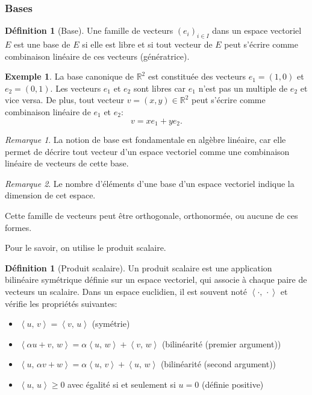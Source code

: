 \documentclass[11pt,a4paper]{article}
\numberwithin{equation}{section}
\theoremstyle{plain}
\theoremstyle{definition}
\newtheorem{definition}[theorem]{Définition}
\newtheorem{example}[theorem]{Exemple}
\theoremstyle{remark}
\newtheorem*{remark}{Remarque}
\newcommand{\R}{\mathbb{R}}
\newcommand{\ip}[2]{\left\langle #1,\, #2\right\rangle}
\begin{document}
\subsubsection{Bases}

\begin{definition}[Base]
Une famille de vecteurs \((e_i)_{i \in I}\) dans un espace vectoriel \(E\) est une base de \(E\) si elle est libre et si tout vecteur de \(E\) peut s'écrire  comme combinaison linéaire de ces vecteurs (génératrice).
\end{definition}

\begin{example}
    La base canonique de \(\R^2\) est constituée des vecteurs \(e_1 = (1, 0)\) et \(e_2 = (0, 1)\).
    Les vecteurs \(e_1\) et \(e_2\) sont libres car $e_1$ n'est pas un multiple de $e_2$ et vice versa.
    De plus, tout vecteur \(v = (x, y) \in \R^2\) peut s'écrire comme combinaison linéaire de \(e_1\) et \(e_2\):
    \[
        v = x e_1 + y e_2.
    \]
\end{example}

\begin{remark}
    La notion de base est fondamentale en algèbre linéaire, car elle permet de décrire tout vecteur d'un espace vectoriel comme une combinaison linéaire de vecteurs de cette base.
\end{remark}

\begin{remark}
    Le nombre d'éléments d'une base d'un espace vectoriel indique la dimension de cet espace.
\end{remark}

Cette famille de vecteurs peut être orthogonale, orthonormée, ou aucune de ces formes.

Pour le savoir, on utilise le produit scalaire.


\begin{definition}[Produit scalaire] \label{def:ip}
    Un produit scalaire est une application bilinéaire symétrique définie sur un espace vectoriel, qui associe à chaque paire de vecteurs un scalaire. Dans un espace euclidien, il est souvent noté \(\ip{\cdot}{\cdot}\) et vérifie les propriétés suivantes:
    \begin{itemize}
        \item \(\ip{u}{v} = \ip{v}{u}\) (symétrie)
        \item \(\ip{\alpha u + v}{w} = \alpha \ip{u}{w} + \ip{v}{w}\) (bilinéarité (premier argument))
        \item \(\ip{u}{\alpha v + w} = \alpha \ip{u}{v} + \ip{u}{w}\) (bilinéarité (second argument))
        \item \(\ip{u}{u} \geq 0\) avec égalité si et seulement si \(u = 0\) (définie positive)
    \end{itemize}
\end{definition}
\end{document}
